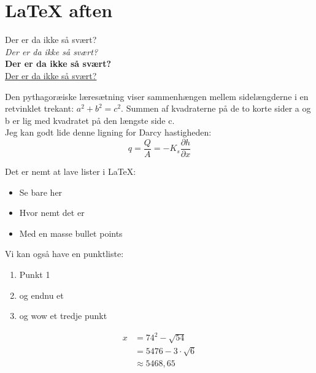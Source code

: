 \documentclass{article}
\begin{document}

\section*{LaTeX aften}
Der er da ikke så svært? \\
\textit{Der er da ikke så svært?} \\
\textbf{Der er da ikke så svært?} \\
\underline{Der er da ikke så svært?}
\newpage %

Den pythagoræiske læresætning viser sammenhængen mellem sidelængderne i en retvinklet trekant: $a^2 + b^2 = c^2$. Summen af kvadraterne på de to korte sider a og b er lig med kvadratet på den længste side c. \\

Jeg kan godt lide denne ligning for Darcy hastigheden:
\begin{equation}
   q=\frac{Q}{A}=-K_s\frac{\partial h}{\partial x}
\end{equation}

Det er nemt at lave lister i LaTeX:
\begin{itemize}
    \item Se bare her
    \item Hvor nemt det er
    \item Med en masse bullet points
\end{itemize}

Vi kan også have en punktliste:
\begin{enumerate}
    \item Punkt 1
    \item og endnu et
    \item og wow et tredje punkt
\end{enumerate}


\begin{align*} 
x &= 74^2 - \sqrt{54}  \\ 
 &=  5476 - 3 \cdot \sqrt{6} \\
 &\approx 5468,65 
\end{align*}
\end{document}
